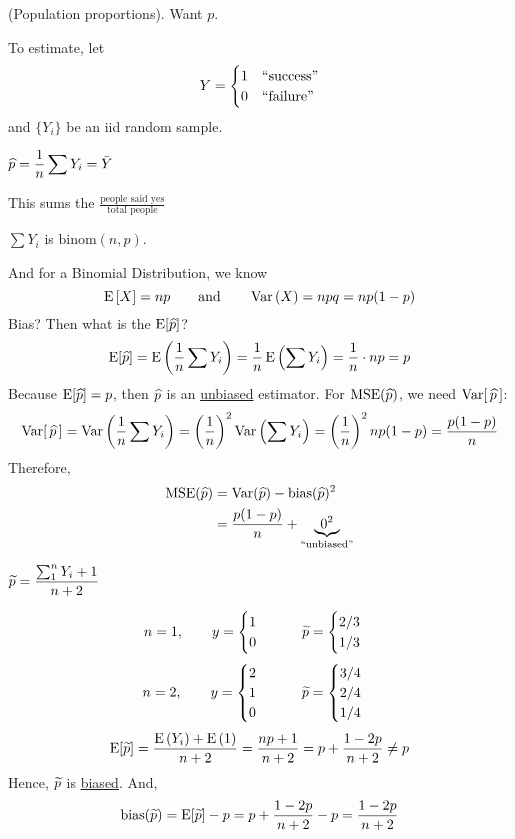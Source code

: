 \example (Population proportions). Want $p$.

\nnl To estimate, let
$$Y = \begin{cases} 
      1 & \text{\say{success}} \\
      0 & \text{\say{failure}} 
   \end{cases}$$
and $\{Y_i\}$ be an iid random sample.

\nnl \textbf{} $\displaystyle \phat = \over{n}\sum Y_i = \Ybar$

\nl This sums the $\frac{\text{people said yes}}{\text{total people}}$

\recall* $\sum Y_i$ is $\text{binom}(n,p)$.

\nnl And for a Binomial Distribution, we know
$$\Eb{X} = np \wideand \Var{X} = npq = np(1-p)$$
Bias? Then what is the $\Eb*{\phat}$?
$$\Eb*{\phat} = \E{\over{n}\sum Y_i} = \over{n}\E{\sum Y_i} = \over{n}\cdot np = p$$
Because $\Eb*{\phat} = p$, then $\widehat{p}$ is an \underline{unbiased} estimator. For $\MSE*{\phat}$, we need $\Varb*{\phat}$:
$$\Varb*{\phat} = \Var{\over{n}\sum Y_i} = \pover{n}^2 \Var{\sum Y_i} = \pars{\over{n}}^2 np(1-p) = \frac{p(1-p)}{n}$$
Therefore,
\begin{align*}
    \MSE*{\phat} &= \Var*{\phat} - \bias*{\phat}^2\\
    &= \frac{p(1-p)}{n} + \underbrace{0^2}_{\text{\say{unbiased}}}
\end{align*}

\nnl \textbf{} $\displaystyle \widetilde{p} = \frac{\sum_1^n Y_i + 1}{n+2}$

$$n = 1, \qquad y = \begin{cases} 
      1\\
      0
   \end{cases} \qquad \widetilde{p} = \begin{cases} 
      2/3 & \\
      1/3 \\
   \end{cases}$$
   $$n = 2, \qquad y = \begin{cases} 
      2\\
      1\\
      0
   \end{cases} \qquad \widetilde{p} = \begin{cases} 
      3/4 \\
      2/4\\
      1/4
   \end{cases}$$
$$\Eb*{\ptilde} = \frac{\E{Y_i} + \E{1}}{n+2} = \frac{np+1}{n+2} = p + \frac{1-2p}{n+2} \neq p$$
Hence, $\widetilde{p}$ is \underline{biased}. And,
$$\bias*{\ptilde} = \Eb*{\ptilde} - p = p + \frac{1-2p}{n+2} - p = \frac{1-2p}{n+2}$$

